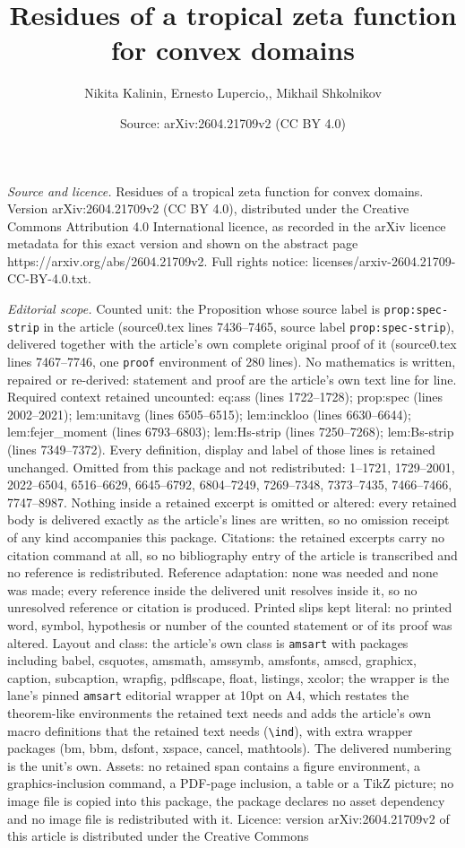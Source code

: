 \documentclass[10pt,a4paper]{amsart}
\title[Residues of a tropical zeta function for convex domains]{Residues of a tropical zeta function for convex domains}
\author{Nikita Kalinin, Ernesto Lupercio,, Mikhail Shkolnikov}
\date{Source: arXiv:2604.21709v2 (CC BY 4.0)}
\begin{document}
\maketitle

\noindent\emph{Source and licence.} Residues of a tropical zeta function for convex domains. Version arXiv:2604.21709v2 (CC BY 4.0), distributed under the Creative Commons Attribution 4.0 International licence, as recorded in the arXiv licence metadata for this exact version and shown on the abstract page https://arxiv.org/abs/2604.21709v2. Full rights notice: licenses/arxiv-2604.21709-CC-BY-4.0.txt.\par\smallskip

\noindent\textit{Editorial scope.} Counted unit: the Proposition whose source label is \texttt{prop:spec-strip} in the article (source0.tex lines 7436--7465, source label \texttt{prop:spec-strip}), delivered together with the article's own complete original proof of it (source0.tex lines 7467--7746, one \texttt{proof} environment of 280 lines). No mathematics is written, repaired or re-derived: statement and proof are the article's own text line for line. Required context retained uncounted: eq:ass (lines 1722--1728); prop:spec (lines 2002--2021); lem:unitavg (lines 6505--6515); lem:inckloo (lines 6630--6644); lem:fejer\_moment (lines 6793--6803); lem:Hs-strip (lines 7250--7268); lem:Bs-strip (lines 7349--7372). Every definition, display and label of those lines is retained unchanged. Omitted from this package and not redistributed: 1--1721, 1729--2001, 2022--6504, 6516--6629, 6645--6792, 6804--7249, 7269--7348, 7373--7435, 7466--7466, 7747--8987. Nothing inside a retained excerpt is omitted or altered: every retained body is delivered exactly as the article's lines are written, so no omission receipt of any kind accompanies this package. Citations: the retained excerpts carry no citation command at all, so no bibliography entry of the article is transcribed and no reference is redistributed. Reference adaptation: none was needed and none was made; every reference inside the delivered unit resolves inside it, so no unresolved reference or citation is produced. Printed slips kept literal: no printed word, symbol, hypothesis or number of the counted statement or of its proof was altered. Layout and class: the article's own class is \texttt{amsart} with packages including babel, csquotes, amsmath, amssymb, amsfonts, amscd, graphicx, caption, subcaption, wrapfig, pdflscape, float, listings, xcolor; the wrapper is the lane's pinned \texttt{amsart} editorial wrapper at 10pt on A4, which restates the theorem-like environments the retained text needs and adds the article's own macro definitions that the retained text needs (\texttt{\textbackslash ind}), with extra wrapper packages (bm, bbm, dsfont, xspace, cancel, mathtools). The delivered numbering is the unit's own. Assets: no retained span contains a figure environment, a graphics-inclusion command, a PDF-page inclusion, a table or a TikZ picture; no image file is copied into this package, the package declares no asset dependency and no image file is redistributed with it. Licence: version arXiv:2604.21709v2 of this article is distributed under the Creative Commons 
\end{document}
